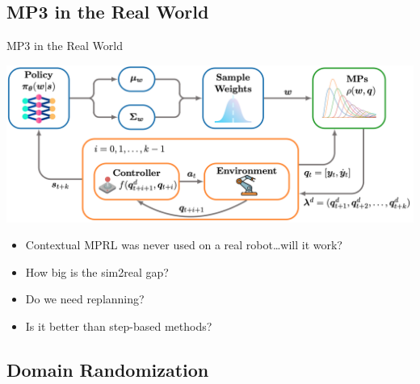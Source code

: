 \documentclass[16:9,en,navbarinfooter]{sdqbeamer}
\begin{document}
\subsection{MP3 in the Real World}
\begin{frame}{MP3 in the Real World}

	\center
	\vspace{1cm}
	\includegraphics[width=.7\linewidth]{media/mp3.png}
	\begin{itemize}
		\item Contextual MPRL was never used on a real robot\dots will it work?
		\item How big is the sim2real gap?
		\item Do we need replanning?
		\item Is it better than step-based methods?
	\end{itemize}
\end{frame}

\subsection{Domain Randomization}
\end{document}
